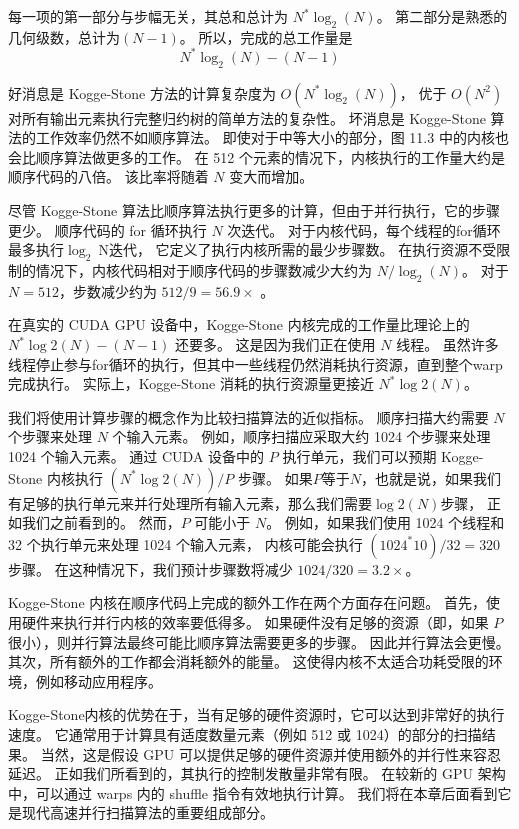 每一项的第一部分与步幅无关，其总和总计为 $N^{*} \log _{2}(N)$。 
第二部分是熟悉的几何级数，总计为$(N-1)$。 所以，完成的总工作量是
$$
N^{*} \log _{2}(N)-(N-1)
$$

好消息是 Kogge-Stone 方法的计算复杂度为 $O\left(N^{*} \log _{2}(N)\right)$，
优于 $O\left(N^{ 2}\right)$ 对所有输出元素执行完整归约树的简单方法的复杂性。 
坏消息是 Kogge-Stone 算法的工作效率仍然不如顺序算法。 
即使对于中等大小的部分，图 11.3 中的内核也会比顺序算法做更多的工作。 
在 512 个元素的情况下，内核执行的工作量大约是顺序代码的八倍。 该比率将随着 $N$ 变大而增加。

尽管 Kogge-Stone 算法比顺序算法执行更多的计算，但由于并行执行，它的步骤更少。 
顺序代码的 for 循环执行 $N$ 次迭代。 对于内核代码，每个线程的for循环最多执行$\log _{2} \mathrm{~N}$迭代，
它定义了执行内核所需的最少步骤数。 
在执行资源不受限制的情况下，内核代码相对于顺序代码的步骤数减少大约为 $N / \log _{2}(N)$。 
对于 $N=512$，步数减少约为 $512/9=56.9\times$ 。

在真实的 CUDA GPU 设备中，Kogge-Stone 内核完成的工作量比理论上的 $N^{*} \log 2(N)-(N-1)$ 还要多。 
这是因为我们正在使用 $N$ 线程。 
虽然许多线程停止参与for循环的执行，但其中一些线程仍然消耗执行资源，直到整个warp完成执行。 
实际上，Kogge-Stone 消耗的执行资源量更接近 $N^{*} \log 2(N)$。

我们将使用计算步骤的概念作为比较扫描算法的近似指标。 顺序扫描大约需要 $N$ 个步骤来处理 $N$ 个输入元素。 
例如，顺序扫描应采取大约 1024 个步骤来处理 1024 个输入元素。 
通过 CUDA 设备中的 $P$ 执行单元，我们可以预期 Kogge-Stone 内核执行 $\left(N^{*} \log 2(N)\right) / P$ 步骤。 
如果$P$等于$N$，也就是说，如果我们有足够的执行单元来并行处理所有输入元素，那么我们需要$\log 2(N)$步骤，
正如我们之前看到的。 然而，$P$ 可能小于 $N$。 
例如，如果我们使用 1024 个线程和 32 个执行单元来处理 1024 个输入元素，
内核可能会执行 $\left(1024^{*} 10\right) / 32=320$ 步骤。 
在这种情况下，我们预计步骤数将减少 $1024 / 320=3.2 \times$。

Kogge-Stone 内核在顺序代码上完成的额外工作在两个方面存在问题。 首先，使用硬件来执行并行内核的效率要低得多。 
如果硬件没有足够的资源（即，如果 $P$ 很小），则并行算法最终可能比顺序算法需要更多的步骤。 因此并行算法会更慢。 
其次，所有额外的工作都会消耗额外的能量。 这使得内核不太适合功耗受限的环境，例如移动应用程序。

Kogge-Stone内核的优势在于，当有足够的硬件资源时，它可以达到非常好的执行速度。 
它通常用于计算具有适度数量元素（例如 512 或 1024）的部分的扫描结果。
当然，这是假设 GPU 可以提供足够的硬件资源并使用额外的并行性来容忍延迟。 正如我们所看到的，其执行的控制发散量非常有限。 
在较新的 GPU 架构中，可以通过 warps 内的 shuffle 指令有效地执行计算。 
我们将在本章后面看到它是现代高速并行扫描算法的重要组成部分。

